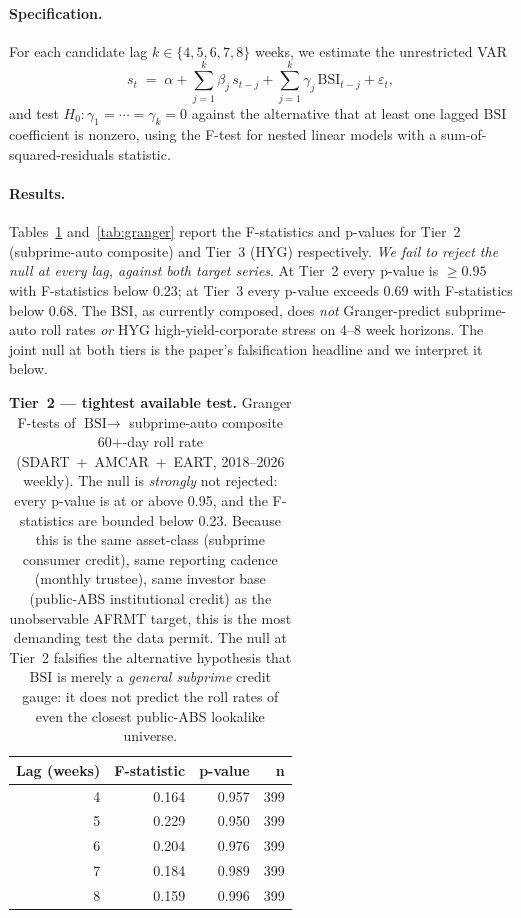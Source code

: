 \documentclass[11pt,letterpaper]{article}
\newcommand{\bsi}{\text{BSI}}
\begin{document}
\paragraph{Specification.}
For each candidate lag $k \in \{4, 5, 6, 7, 8\}$ weeks, we estimate
the unrestricted VAR
%
\begin{equation}
s_t
\;=\;
\alpha
+ \sum_{j=1}^{k} \beta_j\, s_{t-j}
+ \sum_{j=1}^{k} \gamma_j\, \bsi_{t-j}
+ \varepsilon_t,
\label{eq:var}
\end{equation}
%
and test $H_0: \gamma_1 = \cdots = \gamma_k = 0$ against the
alternative that at least one lagged $\bsi$ coefficient is nonzero,
using the F-test for nested linear models with a sum-of-squared-residuals
statistic.

\paragraph{Results.}
Tables~\ref{tab:granger-t2} and~\ref{tab:granger} report the
F-statistics and p-values for Tier~2 (subprime-auto composite) and
Tier~3 (HYG) respectively. \emph{We fail to reject the null at
every lag, against both target series}. At Tier~2 every p-value is
$\ge 0.95$ with F-statistics below 0.23; at Tier~3 every p-value
exceeds 0.69 with F-statistics below 0.68. The BSI, as currently
composed, does \emph{not} Granger-predict subprime-auto roll rates
\emph{or} HYG high-yield-corporate stress on 4--8 week horizons.
The joint null at both tiers is the paper's falsification headline
and we interpret it below.

\begin{table}[H]
\centering
\small
\begin{tabular}{rrrr}
\toprule
\textbf{Lag (weeks)} & \textbf{F-statistic} & \textbf{p-value} & \textbf{n} \\
\midrule
4 & 0.164 & 0.957 & 399 \\
5 & 0.229 & 0.950 & 399 \\
6 & 0.204 & 0.976 & 399 \\
7 & 0.184 & 0.989 & 399 \\
8 & 0.159 & 0.996 & 399 \\
\bottomrule
\end{tabular}
\caption{\textbf{Tier~2 --- tightest available test.} Granger F-tests
of $\bsi \rightarrow $ subprime-auto composite 60+-day roll rate
(SDART~+~AMCAR~+~EART, 2018--2026 weekly). The null is \emph{strongly}
not rejected: every p-value is at or above 0.95, and the F-statistics
are bounded below 0.23. Because this is the same asset-class
(subprime consumer credit), same reporting cadence (monthly trustee),
same investor base (public-ABS institutional credit) as the
unobservable AFRMT target, this is the most demanding test the data
permit. The null at Tier~2 falsifies the alternative hypothesis that
$\bsi$ is merely a \emph{general subprime} credit gauge: it does not
predict the roll rates of even the closest public-ABS lookalike
universe.}
\label{tab:granger-t2}
\end{table}
\end{document}
